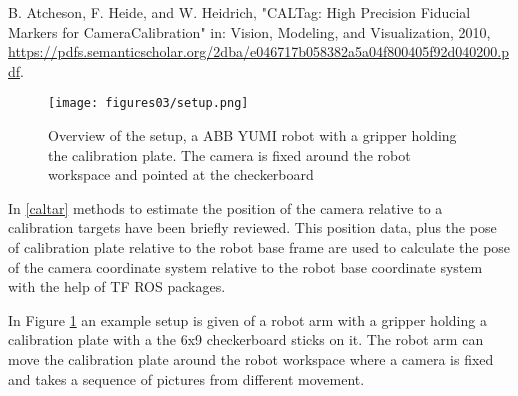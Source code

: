 \iffalse
The new generation of the collaborative robots allow the use of small robot arms working in an asynchronous or synchronous fashion with human workers.  Such an example of the collaborative robot is the YuMi robot, dual 7-DOF robot arms designed for precise manipulation of small parts better known in computer vision as rigid body. For further acceptance of such robots in the industry, some methods and sensors systems have to be developed to allow them to pick parts without the position of the part being known in advance, just as humans do.
This thesis is focused on the implementation of an algorithm for determing the positition of the known parts. We first deal with a robot-camera calibration, then  we propose a method to obtain the ground truth position of known parts. As step in between a 3D model of the known part needs to be created.
\fi


		B. Atcheson, F. Heide, and W. Heidrich,
		"CALTag: High Precision Fiducial Markers for CameraCalibration" in: Vision, Modeling, and Visualization, 2010, \url{https://pdfs.semanticscholar.org/2dba/e046717b058382a5a04f800405f92d040200.pdf}.






\begin{figure}[!h]
\begin{center}
\texttt{[image: figures03/setup.png]}
\caption{Overview of the setup, a ABB YUMI robot with a gripper holding the calibration plate. The camera is fixed around the robot workspace and pointed at the checkerboard}%
\label{fig:setup}
\end{center}
\end{figure}



In \ref{caltar} methods to estimate the position of the camera relative to a calibration targets have been briefly reviewed. This position data, plus the pose of calibration plate relative to the robot base frame are used to calculate the pose of the camera coordinate system relative to the robot base coordinate system with the help of TF ROS packages.




In Figure \ref{fig:setup} an example setup is given of a robot arm with a gripper holding a calibration plate with a the 6x9  checkerboard sticks on it. The robot arm can move the calibration plate around the robot workspace where a camera is fixed and takes a sequence of pictures from different movement.



